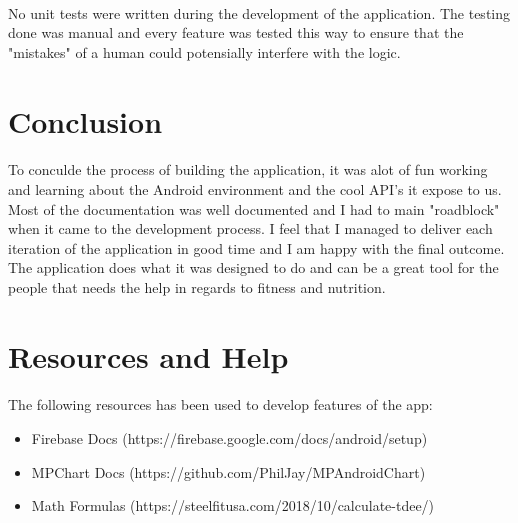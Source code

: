 \documentclass{article}
\begin{document}
\paragraph{}
    No unit tests were written during the development of the application. The testing done was manual and every feature was tested this way to ensure that the "mistakes" of a human
    could potensially interfere with the logic.

\newpage

\section{Conclusion}
\paragraph{}
    To conculde the process of building the application, it was alot of fun working and learning about the Android environment and the cool API's it expose to us. 
    Most of the documentation was well documented and I had to main "roadblock" when it came to the development process. I feel that I managed to deliver each iteration
    of the application in good time and I am happy with the final outcome. The application does what it was designed to do and can be a great tool for the people that
    needs the help in regards to fitness and nutrition.
\newpage

\section{Resources and Help}
\paragraph{}
    The following resources has been used to develop features of the app:

    \begin{itemize}
        \item Firebase Docs (https://firebase.google.com/docs/android/setup)
        \item MPChart Docs (https://github.com/PhilJay/MPAndroidChart)
        \item Math Formulas (https://steelfitusa.com/2018/10/calculate-tdee/)
    \end{itemize}
\end{document}
